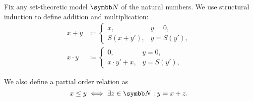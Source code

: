 \begin{definition}\label{def:natural_number_operations}
  Fix any set-theoretic model \( \BB{N} \) of the natural numbers. We use structural induction to define addition and multiplication:
  \begin{align*}
    x + y &\coloneqq \begin{cases}
      x, &y = 0, \\
      S(x + y'), &y = S(y'),
    \end{cases}
    \\
    x \cdot y &\coloneqq \begin{cases}
      0, &y = 0, \\
      x \cdot y' + x, &y = S(y'),
    \end{cases}
  \end{align*}

  We also define a partial order relation as
  \begin{equation*}
    x \leq y \iff \exists z \in \BB{N}: y = x + z.
  \end{equation*}
\end{definition}


